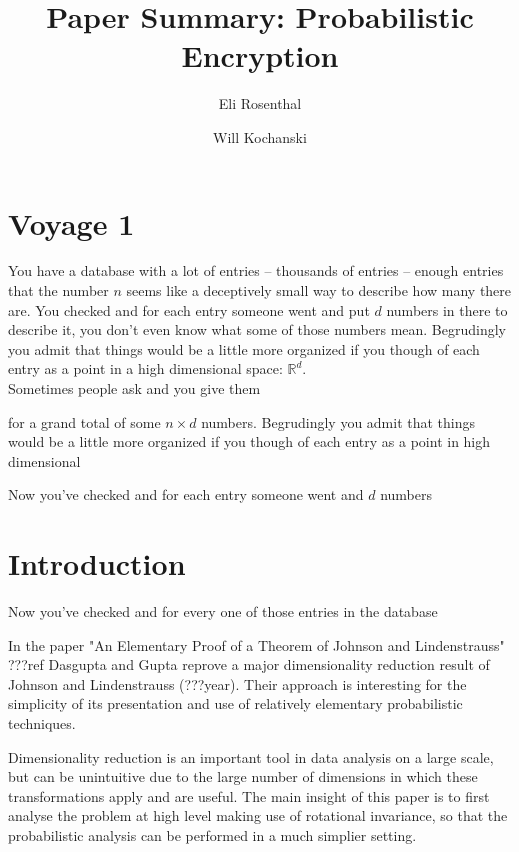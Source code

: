 \documentclass[11pt]{article}
\author{Eli Rosenthal \and Will Kochanski}
\date{}
\title{Paper Summary: Probabilistic Encryption}
\newcommand{\R}{\mathbb{R}}
\begin{document}
\maketitle
\section*{Voyage 1}
You have a database with a lot of entries -- thousands of entries -- enough entries that the number $n$ seems like a deceptively small way to describe how many there are. You checked and for each entry someone went and put $d$ numbers in there to describe it, you don't even know what some of those numbers mean. Begrudingly you admit that things would be a little more organized if you though of each entry as a point in a high dimensional space: $\R^d$. \\

Sometimes people ask and you give them 

for a grand total of some $n\times d$ numbers. Begrudingly you admit that things would be a little more organized if you though of each entry as a point in high dimensional

Now you've checked and for each entry someone went and $d$ numbers


\section{Introduction}

Now you've checked and for every one of those entries in the database


In the paper "An Elementary Proof of a Theorem of Johnson and Lindenstrauss" ???ref Dasgupta and Gupta reprove a major dimensionality reduction result of Johnson and Lindenstrauss (???year). Their approach is interesting for the simplicity of its presentation and use of relatively elementary probabilistic techniques.

Dimensionality reduction is an important tool in data analysis on a large scale, but can be unintuitive due to the large number of dimensions in which these transformations apply and are useful. The main insight of this paper is to first analyse the problem at high level making use of rotational invariance, so that the probabilistic analysis can be performed in a much simplier setting.
\end{document}
